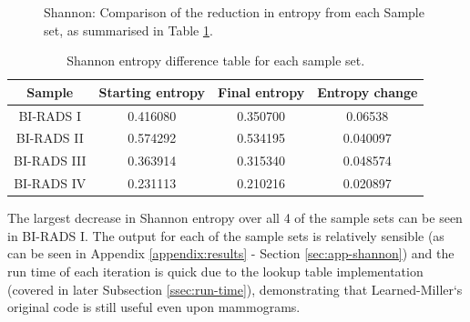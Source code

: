 \begin{figure}[H]
  \begin{center}
    \caption{Shannon: Comparison of the reduction in entropy from each Sample set, as summarised in Table \ref{table:shannon-entropy}.}
    \label{fig:shannon-graph}
  \end{center}
\end{figure}

\begin{table}[H]
  \centering
  \begin{tabular}{| c  c  c   c |}
    \textbf{Sample} & \textbf{Starting entropy} & \textbf{Final entropy} & \textbf{Entropy change} \\ \hline
    BI-RADS I & 0.416080 & 0.350700 & 0.06538 \\ \hline
    BI-RADS II & 0.574292 & 0.534195 & 0.040097 \\ \hline
    BI-RADS III & 0.363914 & 0.315340 & 0.048574 \\ \hline
    BI-RADS IV & 0.231113 & 0.210216 & 0.020897 \\
  \end{tabular}
  \caption{Shannon entropy difference table for each sample set.}
  \label{table:shannon-entropy}
\end{table}

The largest decrease in Shannon entropy over all 4 of the sample sets can be seen in BI-RADS I. The output for each of the sample sets is relatively sensible (as can be seen in  Appendix \ref{appendix:results} - Section \ref{sec:app-shannon}) and the run time of each iteration is quick due to the lookup table implementation (covered in later Subsection \ref{ssec:run-time}), demonstrating that Learned-Miller`s original code is still useful even upon mammograms.

